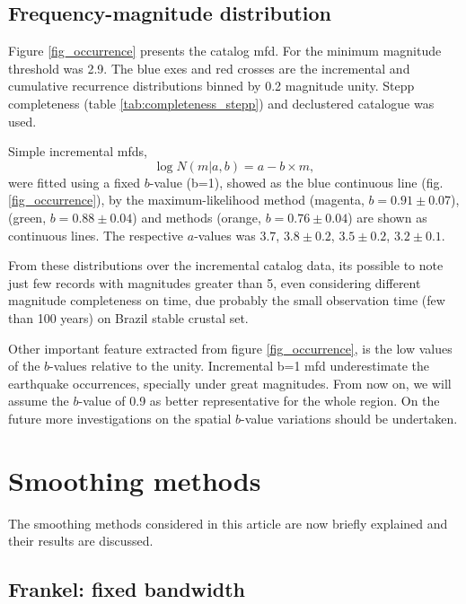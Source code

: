 \documentclass[draft, grl]{agutex}
\begin{document}
\begin{article}
\subsection{Frequency-magnitude distribution}

Figure \ref{fig_occurrence} presents the catalog \gls{mfd}. For the minimum magnitude threshold was 2.9. The blue exes and red crosses are the incremental and cumulative recurrence distributions binned by 0.2 magnitude unity. Stepp completeness (table \ref{tab:completeness_stepp}) and \citet{bsb_2014} declustered catalogue was used. 

Simple \citet{gutenberg_richter_1944} incremental \glspl{mfd},
\begin{equation}
\log{N}(m|a,b) = a - b \times m,
\end{equation}
were fitted using a fixed $b$-value (b=1), showed as the blue continuous line (fig. \ref{fig_occurrence}), by the maximum-likelihood method (magenta, $b=0.91\pm0.07$), \citet{weichert_1980} (green, $b=0.88\pm0.04$) and \citet{kijko_2012} methods (orange, $b=0.76\pm0.04$) are shown as continuous lines. The respective $a$-values was $3.7$, $3.8\pm0.2$, $3.5\pm0.2$, $3.2\pm0.1$.

From these distributions over the incremental catalog data, its possible to note just few records with magnitudes greater than 5, even considering different magnitude completeness on time, due probably the small observation time (few than 100 years) on Brazil stable crustal set.

Other important feature extracted from figure \ref{fig_occurrence}, is the low values of the $b$-values relative to the unity. Incremental b=1 \gls{mfd} underestimate the earthquake occurrences, specially under great magnitudes. From now on, we will assume the $b$-value of 0.9 as better representative for the whole region. On the future more investigations on the spatial $b$-value variations should be undertaken.

%
%
\section{Smoothing methods}
The smoothing methods considered in this article are now briefly explained and their results are discussed.

\subsection{Frankel: fixed bandwidth}


\end{article}
\end{document}
